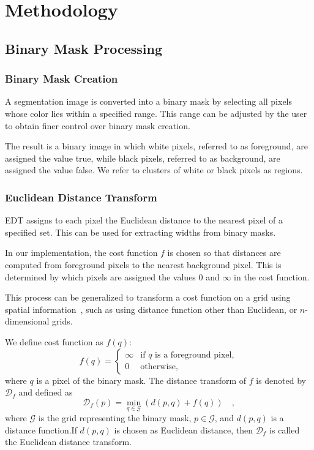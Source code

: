 \chapter{Methodology}
\label{chap:methodology}

\section{Binary Mask Processing}

\subsection{Binary Mask Creation}


A segmentation image is converted into a binary mask by selecting all pixels whose color lies within a specified range. This range can be adjusted by the user to obtain finer control over binary mask creation.

The result is a binary image in which white pixels, referred to as foreground, are assigned the value true, while black pixels, referred to as background, are assigned the value false. We refer to clusters of white or black pixels as regions. 

\subsection{Euclidean Distance Transform}

\ac{EDT} assigns to each pixel the Euclidean distance to the nearest pixel of a specified set. This can be used for extracting widths from binary masks.

In our implementation, the cost function $f$ is chosen so that distances are computed from foreground pixels to the nearest background pixel. This is determined by which pixels are assigned the values $0$ and $\infty$ in the cost function.

This process can be generalized to transform a cost function on a grid using spatial information~\cite{bk_edt}, such as using distance function other than Euclidean, or $n$-dimensional grids.

We define cost function as $f(q)$:
\begin{equation}
	f(q) =
	\begin{cases}
		\infty & \text{if } q \text{ is a foreground pixel}, \\
		0 & \text{otherwise},
	\end{cases}
\end{equation}
where $q$ is a pixel of the binary mask. The distance transform of $f$ is denoted by $\mathcal{D}_f$ and defined as
\begin{equation}
	\mathcal{D}_f(p) = \min_{q\in \mathcal{G}}\left(d(p,q) + f(q)\right)\quad,
\end{equation}
where $\mathcal{G}$ is the grid representing the binary mask, $p \in \mathcal{G}$, and $d(p,q)$ is a distance function.If $d(p,q)$ is chosen as Euclidean distance, then $\mathcal{D}_f$ is called the Euclidean distance transform.

